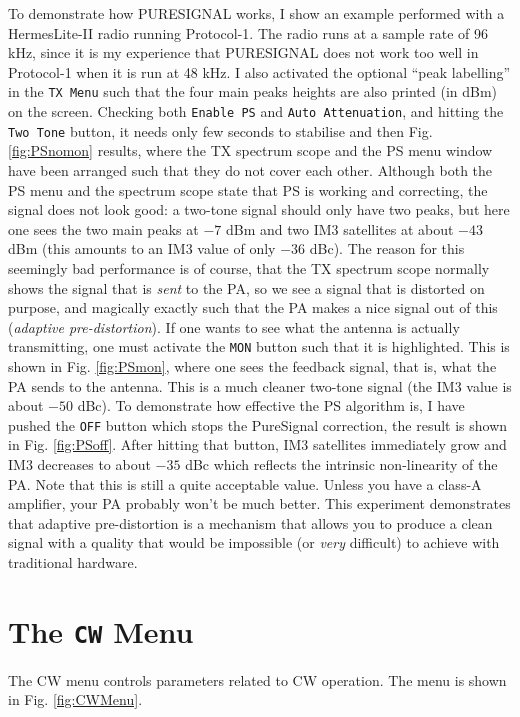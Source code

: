\documentclass[12pt]{book}
\def\rett#1{\texttt{\color{red}#1}}
\def\bltt#1{\texttt{\color{blue}#1}}
\begin{document}
To demonstrate how PURESIGNAL works, I show an example performed with a Hermes\-Lite-II
radio running Protocol-1. The radio runs at a sample rate of 96 kHz, since it is my
experience that PURESIGNAL does not work too well in Protocol-1 when it is run
at 48 kHz. I also activated the optional ``peak labelling''
in the \bltt{TX Menu} such that the four main peaks heights are also printed
(in dBm) on the screen. Checking both \rett{Enable PS} and
\rett{Auto Attenuation}, and hitting the \rett{Two Tone} button, it needs only few
seconds to stabilise and then Fig. \ref{fig:PSnomon} results, where the TX
spectrum scope and the PS menu window have been arranged such that they do
not cover each other. Although both the PS menu and the spectrum scope state
that PS is working and correcting, the signal does not look good: a two-tone
signal should only have two peaks, but here one sees the two main peaks at $-7$ dBm
and two IM3 satellites at about $-43$ dBm (this amounts to an IM3 value of only $-36$ dBc).
The reason for this seemingly bad performance is of course, that the TX spectrum scope
normally shows the signal that is \textit{sent} to the PA, so we see a signal that
is distorted on purpose, and magically
exactly such that the PA makes a nice signal
out of this (\textit{adaptive pre-distortion}). If one wants to see what the antenna
is actually transmitting, one must
activate the \rett{MON} button such that it is highlighted.
This is shown in Fig. \ref{fig:PSmon}, where one sees the
feedback signal, that is, what the PA sends to the antenna.
This is a much cleaner two-tone signal (the IM3 value is about $-50$ dBc).
To demonstrate how effective the PS algorithm is,
I have pushed the \rett{OFF} button which stops the PureSignal correction, the result
is shown in Fig. \ref{fig:PSoff}. After hitting that button, IM3 satellites immediately
grow and IM3 decreases to
about $-35$ dBc which reflects the intrinsic
non-linearity of the PA.
Note that this is still a quite acceptable value.
Unless you have a class-A amplifier, your PA probably won't be much better.
This experiment demonstrates that adaptive pre-distortion is a mechanism that allows you to produce a clean
signal with a quality that would be impossible (or \textit{very} difficult) to achieve
with traditional hardware.

\section{The \texttt{CW} Menu}
The CW menu controls parameters related to CW operation. The menu
is shown in Fig. \ref{fig:CWMenu}.
\end{document}

